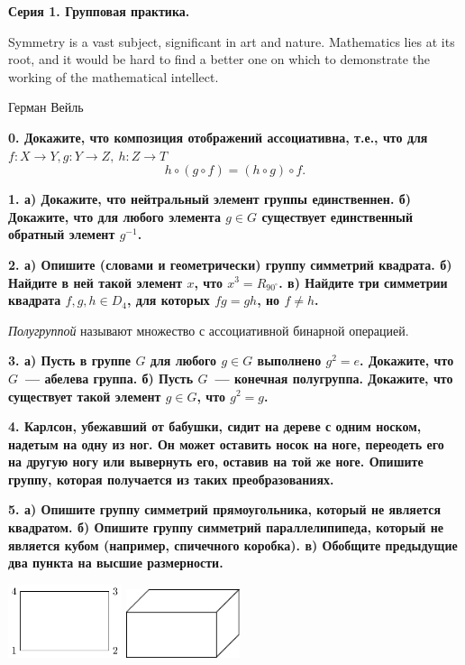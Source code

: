\documentclass[10pt]{article}
\begin{document}
	\begin{landscape}

	\pagestyle{empty}
	\begin{multicols}{2}

	\centerline{\bf{Серия 1. Групповая практика. }}

	\epigraph{Symmetry is a vast subject, significant in art and nature. Mathematics lies at its root, and it would be hard to find a better one on which to demonstrate the working of the mathematical intellect.}{Герман Вейль}

	\bf{0.} Докажите, что композиция отображений ассоциативна, т.е., что для $f \colon X \to Y, g \colon Y \to Z, \ h \colon Z \to T$
	\[
		h \circ (g \circ f) = (h \circ g) \circ f.
	\]

	\bf{1.} а) Докажите, что нейтральный элемент группы единственнен. б) Докажите, что для любого элемента $g \in G$ существует единственный обратный элемент $g^{-1}$. 

	\bf{2.} а) Опишите (словами и геометрически) группу симметрий квадрата. б) Найдите в ней такой элемент $x$, что $x^3 = R_{90^{\circ}}$. в) Найдите три симметрии квадрата $f, g, h \in D_{4}$, для которых $fg = gh$, но $f \neq h$.

	\begin{definition} 
		\emph{Полугруппой} называют множество с ассоциативной бинарной операцией. 
	\end{definition}

	\bf{3.} а)  Пусть в группе $G$ для любого $g \in G$ выполнено $g^2 = e$. Докажите, что $G$~--- абелева группа.  б) Пусть $G$~--- конечная полугруппа. Докажите, что существует такой элемент $g \in G$, что $g^2 = g$.

	\bf{4.} Карлсон, убежавший от бабушки, сидит на дереве с одним носком, надетым на одну из ног. Он может оставить носок на ноге, переодеть его на другую ногу или вывернуть его, оставив на той же ноге. Опишите группу, которая получается из таких преобразованиях. 

	\bf{5.} а) Опишите группу симметрий прямоугольника, который не является квадратом. б) Опишите группу симметрий параллелипипеда, который не является кубом (например, спичечного коробка). в) Обобщите предыдущие два пункта на высшие размерности. 

	\begin{center}
	\begin{minipage}{6in}
		\includegraphics[width=0.25\textwidth]{pic/pic_1.pdf}
		\hspace{10mm}
		\includegraphics[width=0.25\textwidth]{pic/pic_2.pdf}
	\end{minipage}
	\end{center}



\end{multicols}
\end{landscape}
\end{document}

